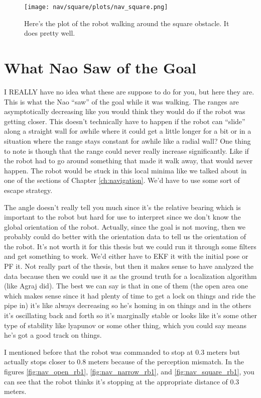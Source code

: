 \begin{figure}
  \texttt{[image: nav/square/plots/nav\_square.png]}
  \caption{Here's the plot of the robot walking around the square obstacle. It does pretty well.}
  \label{fig:nav_square_plot1}
\end{figure}

\section{What Nao Saw of the Goal}

I REALLY have no idea what these are suppose to do for you, but here they are.
This is what the Nao ``saw'' of the goal while it was walking.
The ranges are asymptotically decreasing like you would think they would do if the robot
was getting closer. This doesn't technically have to happen if the robot can ``slide''
along a straight wall for awhile where it could get a little longer for a bit or in a situation
where the range stays constant for awhile like a radial wall?
One thing to note is though that the range could never really increase significantly.
Like if the robot had to go around something that made it walk away, that would never happen.
The robot would be stuck in this local minima like we talked about in one of the sections of Chapter
\ref{ch:navigation}.
We'd have to use some sort of escape strategy.

The angle doesn't really tell you much since it's the relative bearing which is important to the robot
but hard for use to interpret since we don't know the global orientation of the robot.
Actually, since the goal is not moving, then we probably could do better with the orientation data
to tell us the orientation of the robot. It's not worth it for this thesis but we could run it through
some filters and get something to work. We'd either have to EKF it with the initial pose or PF it.
Not really part of the thesis, but then it makes sense to have analyzed the data because then we could
use it as the ground truth for a localization algorithm (like Agraj did).
The best we can say is that in one of them (the open area one which makes sense since it had plenty of
time to get a lock on things and ride the pipe in) it's like always decreasing so he's homing in on things
and in the others it's oscillating back and forth so it's marginally stable or
looks like it's some other type of stability like lyapunov or some other thing, which you could
say means he's got a good track on things.

I mentioned before that the robot was commanded to stop at 0.3 meters but actually stops closer
to 0.8 meters because of the perception mismatch.
In the figures \ref{fig:nav_open_rb1}, \ref{fig:nav_narrow_rb1}, and \ref{fig:nav_square_rb1},
you can see that the robot thinks it's stopping at the appropriate distance
of 0.3 meters.

